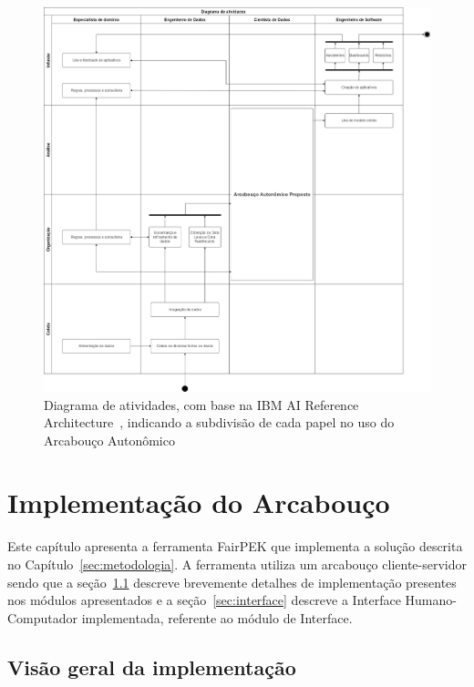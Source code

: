\documentclass[portugues]{ic-tese}
\begin{document}
\begin{figure}[H]
\centering
\includegraphics[scale=0.25]{images/Diagrama_Atividades.jpg}
\caption {Diagrama de atividades, com base na IBM AI Reference Architecture~\citep{IBM_2021}, indicando a subdivisão de cada papel no uso do Arcabouço Autonômico}
\label{fig:AIRoles}
\end{figure}

\chapter{Implementação do Arcabouço}

Este capítulo apresenta a ferramenta FairPEK que implementa a solução descrita no Capítulo~\ref{sec:metodologia}. A ferramenta utiliza um arcabouço cliente-servidor sendo que a seção~\ref{sec:VisaoGeral} descreve brevemente detalhes de implementação presentes nos módulos apresentados e a seção~\ref{sec:interface} descreve a Interface Humano-Computador implementada, referente ao módulo de Interface.

\section{Visão geral da implementação}
\label{sec:VisaoGeral}
\end{document}
